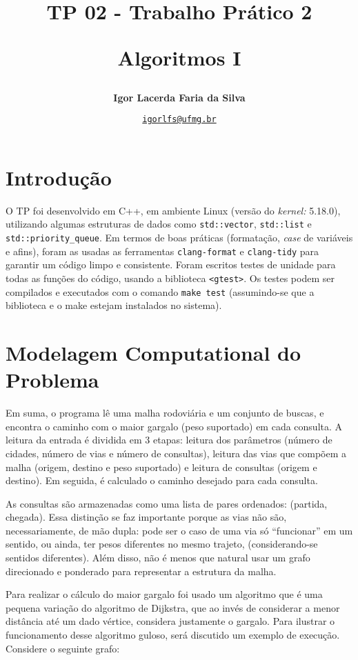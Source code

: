 \documentclass{article}
\author{\textbf{Igor Lacerda Faria da Silva}}
\title{{TP 02 - Trabalho Prático 2}

Algoritmos I}
\date{%
    \href{mailto:igorlfs@ufmg.br}{\nolinkurl{igorlfs@ufmg.br}}
}
\def\code#1{\texttt{#1}}
\begin{document}
\maketitle

\section{Introdução}

O TP foi desenvolvido em C++, em ambiente Linux (versão do \textit{kernel:} 5.18.0), utilizando algumas estruturas de dados como \code{std::vector}, \code{std::list} e \code{std::priority\_queue}. Em termos de boas práticas (formatação, \textit{case} de variáveis e afins), foram as usadas as ferramentas \code{clang-format} e \code{clang-tidy} para garantir um código limpo e consistente. Foram escritos testes de unidade para todas as funções do código, usando a biblioteca \code{<gtest>}. Os testes podem ser compilados e executados com o comando \code{make test} (assumindo-se que a biblioteca e o make estejam instalados no sistema).

\section{Modelagem Computational do Problema}

Em suma, o programa lê uma malha rodoviária e um conjunto de buscas, e encontra o caminho com o maior gargalo (peso suportado) em cada consulta. A leitura da entrada é dividida em 3 etapas: leitura dos parâmetros (número de cidades, número de vias e número de consultas), leitura das vias que compõem a malha (origem, destino e peso suportado) e leitura de consultas (origem e destino). Em seguida, é calculado o caminho desejado para cada consulta.

As consultas são armazenadas como uma lista de pares ordenados: (partida, chegada). Essa distinção se faz importante porque as vias não são, necessariamente, de mão dupla: pode ser o caso de uma via só ``funcionar'' em um sentido, ou ainda, ter pesos diferentes no mesmo trajeto, (considerando-se sentidos diferentes). Além disso, não é menos que natural usar um grafo direcionado e ponderado para representar a estrutura da malha.

Para realizar o cálculo do maior gargalo foi usado um algoritmo que é uma pequena variação do algoritmo de Dijkstra, que ao invés de considerar a menor distância até um dado vértice, considera justamente o gargalo. Para ilustrar o funcionamento desse algoritmo guloso, será discutido um exemplo de execução. Considere o seguinte grafo:
\end{document}
